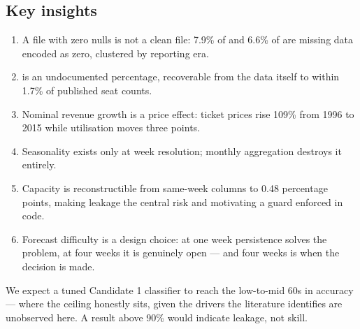 \subsection{Key insights}

\begin{enumerate}\itemsep1pt
\item A file with zero nulls is not a clean file: 7.9\% of 
and 6.6\% of  are missing data encoded as zero, clustered
by reporting era.
\item {} is an undocumented percentage, recoverable from
the data itself to within 1.7\% of published seat counts.
\item Nominal revenue growth is a price effect: ticket prices rise 109\% from
1996 to 2015 while utilisation moves three points.
\item Seasonality exists only at week resolution; monthly aggregation destroys
it entirely.
\item Capacity is reconstructible from same-week columns to 0.48 percentage
points, making leakage the central risk and motivating a guard enforced in code.
\item Forecast difficulty is a design choice: at one week persistence solves the
problem, at four weeks it is genuinely open --- and four weeks is when the
decision is made.
\end{enumerate}

We expect a tuned Candidate 1 classifier to reach the low-to-mid 60s in
accuracy --- where the ceiling honestly sits, given the drivers the literature
identifies are unobserved here. A result above 90\% would indicate leakage, not
skill.
